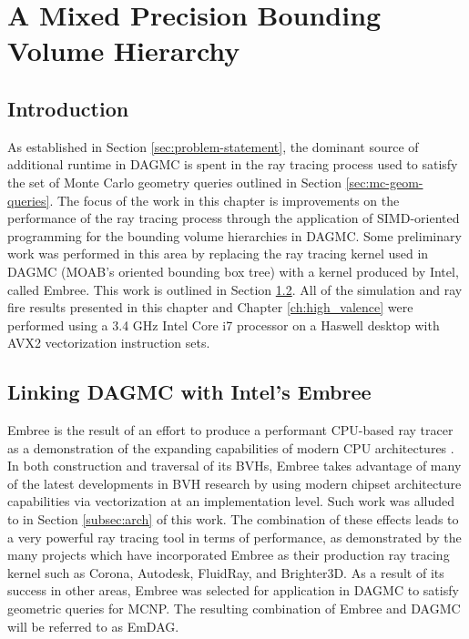 
\chapter{A Mixed Precision Bounding Volume Hierarchy}\label{ch:simd_bvh}

\section{Introduction}

As established in Section \ref{sec:problem-statement}, the dominant source of
additional runtime in DAGMC is spent in the ray tracing process used to satisfy
the set of Monte Carlo geometry queries outlined in Section
\ref{sec:mc-geom-queries}.  The focus of the work in this chapter is
improvements on the performance of the ray tracing process through the
application of SIMD-oriented programming for the bounding volume hierarchies in
DAGMC. Some preliminary work was performed in this area by replacing the ray
tracing kernel used in DAGMC (MOAB's oriented bounding box tree) with a kernel
produced by Intel, called Embree. This work is outlined in Section
\ref{sec:embree}. All of the simulation and ray fire results presented in this
chapter and Chapter \ref{ch:high_valence} were performed using a 3.4 GHz Intel
Core i7 processor on a Haswell desktop with AVX2 vectorization instruction sets.

\section{Linking DAGMC with Intel's Embree}\label{sec:embree}

Embree is the result of an effort to produce a performant CPU-based ray tracer
as a demonstration of the expanding capabilities of modern CPU architectures
\cite{Wald_2014}. In both construction and traversal of its BVHs, Embree takes
advantage of many of the latest developments in BVH research by using modern
chipset architecture capabilities via vectorization at an implementation level.
Such work was alluded to in Section \ref{subsec:arch} of this work. The
combination of these effects leads to a very powerful ray tracing tool in terms
of performance, as demonstrated by the many projects which have incorporated
Embree as their production ray tracing kernel such as Corona, Autodesk,
FluidRay, and Brighter3D. As a result of its success in other areas, Embree was
selected for application in DAGMC to satisfy geometric queries for MCNP. The
resulting combination of Embree and DAGMC will be referred to as EmDAG.

